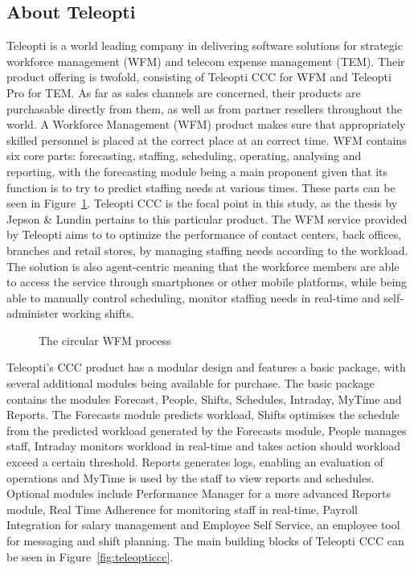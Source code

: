 \subsection{About Teleopti}
Teleopti is a world leading company in delivering software solutions for strategic workforce management (WFM) and telecom expense management (TEM). Their product offering is twofold, consisting of Teleopti CCC for WFM and Teleopti Pro for TEM. As far as sales channels are concerned, their products are purchasable directly from them, as well as from partner resellers throughout the world. A Workforce Management (WFM) product makes sure that appropriately skilled personnel is placed at the correct place at an correct time. WFM contains six core parts: forecasting, staffing, scheduling, operating, analysing and reporting, with the forecasting module being a main proponent given that its function is to try to predict staffing needs at various times. These parts can be seen in Figure~\ref{fig:wfm}. Teleopti CCC is the focal point in this study, as the thesis by Jepson \& Lundin pertains to this particular product. The WFM service provided by Teleopti aims to to optimize the performance of contact centers, back offices, branches and retail stores, by managing staffing needs according to the workload. The solution is also agent-centric meaning that the workforce members are able to access the service through smartphones or other mobile platforms, while being able to manually control scheduling, monitor staffing needs in real-time and self-administer working shifts.  
\begin{figure}[H]
    \centering
    \caption{The circular WFM process}
    \label{fig:wfm}
\end{figure}
Teleopti's CCC product has a modular design and features a basic package, with several additional modules being available for purchase. The basic package contains the modules Forecast, People, Shifts, Schedules, Intraday, MyTime and Reports. The Forecasts module predicts workload, Shifts optimises the schedule from the predicted workload generated by the Forecasts module, People manages staff, Intraday monitors workload in real-time and takes action should workload exceed a certain threshold. Reports generates logs, enabling an evaluation of operations and MyTime is used by the staff to view reports and schedules. Optional modules include Performance Manager for a more advanced Reports module, Real Time Adherence for monitoring staff in real-time, Payroll Integration for salary management and Employee Self Service, an employee tool for messaging and shift planning. The main building blocks of Teleopti CCC can be seen in Figure~\ref{fig:teleopticcc}.

